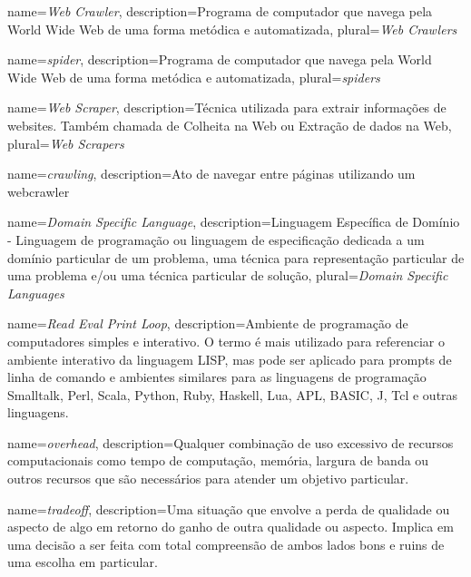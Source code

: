 

				{name={\emph{Web Crawler}},
				 description={Programa de computador que navega pela World Wide Web de uma forma metódica e automatizada},
				 plural={\emph{Web Crawlers}}
				}

				{name={\emph{spider}},
				 description={Programa de computador que navega pela World Wide Web de uma forma metódica e automatizada},
				 plural={\emph{spiders}}
				}
				 
				{name={\emph{Web Scraper}},
				 description={Técnica utilizada para extrair informações de websites. Também chamada de Colheita na Web ou Extração de dados na Web},
				 plural={\emph{Web Scrapers}}
				 }
				 
				{name={\emph{crawling}},
				 description={Ato de navegar entre páginas utilizando um \gls{webcrawler}}
				}
				
				{name={\emph{Domain Specific Language}},
				 description={Linguagem Específica de Domínio - Linguagem de programação ou linguagem de especificação dedicada a um domínio particular de um problema, uma técnica para representação particular de uma problema e/ou uma técnica particular de solução},
				 plural={\emph{Domain Specific Languages}}
				}
				
				{name={\emph{Read Eval Print Loop}},
				 description={Ambiente de programação de computadores simples e interativo. O termo é mais utilizado para referenciar o ambiente interativo da linguagem LISP, mas pode ser aplicado para prompts de linha de comando e ambientes similares para as linguagens de programação Smalltalk, Perl, Scala, Python, Ruby, Haskell, Lua, APL, BASIC, J, Tcl e outras linguagens.}
				}

				{name={\emph{overhead}},
				 description={Qualquer combinação de uso excessivo de recursos computacionais como tempo de computação, memória, largura de banda ou outros recursos que são necessários para atender um objetivo particular.}
				}

				{name={\emph{tradeoff}},
				 description={Uma situação que envolve a perda de qualidade ou aspecto de algo em retorno do ganho de outra qualidade ou aspecto. Implica em uma decisão a ser feita com total compreensão de ambos lados bons e ruins de uma escolha em particular.}
				}